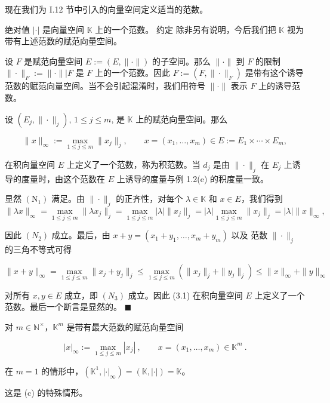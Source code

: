 现在我们为 I.12 节中引入的向量空间定义适当的范数。

\begin{example}

\begin{items}
\item

绝对值 $ |\cdot| $ 是向量空间 $ \mathbb{K} $ 上的一个范数。
约定 除非另有说明，今后我们把 $ \mathbb{K} $ 视为带有上述范数的赋范向量空间。

\item

设 $F$ 是赋范向量空间 $E := (E, \|\cdot\|)$ 的子空间。那么 $\|\cdot\|$ 到 $F$ 的限制 $\|\cdot\|_F := \|\cdot\| \big| F$ 是 $F$ 上的一个范数。因此 $F := (F, \|\cdot\|_F)$ 是带有这个诱导范数的赋范向量空间。当不会引起混淆时，我们用符号 $\|\cdot\|$ 表示 $F$ 上的诱导范数。

\item

设 $ (E_j, \|\cdot\|_j) $,  $ 1 \leq j \leq m $, 是 $ \mathbb{K} $ 上的赋范向量空间。那么

\begin{equation}
\|x\|_{\infty}:=\max_{1\leq j\leq m}\|x_{j}\|_{j},\qquad x=(x_{1},\ldots,x_{m})\in E:=E_{1}\times\cdots\times E_{m},
\end{equation}

在积向量空间 $E$ 上定义了一个范数，称为积范数。当 $d_j$ 是由 $\|\cdot\|_j$ 在 $E_j$ 上诱导的度量时，由这个范数在 $E$ 上诱导的度量与例 1.2(e) 的积度量一致。

\proofhead
显然 $ (\mathrm{N}_1) $ 满足。由 $ \|\cdot\|_j $ 的正齐性，对每个 $ \lambda \in \mathbb{K} $ 和 $ x \in E $，我们得到
\[
\|\lambda x\|_{\infty}=\max_{1\leq j\leq m}\|\lambda x_{j}\|_{j}=\max_{1\leq j\leq m}|\lambda|\|x_{j}\|_{j}=|\lambda|\max_{1\leq j\leq m}\|x_{j}\|_{j}=|\lambda|\|x\|_{\infty},
\]

因此 $ (N_{2}) $ 成立。最后，由 $ x + y = (x_{1} + y_{1}, \ldots, x_{m} + y_{m}) $ 以及
范数 $ \|\cdot\|_j $ 的三角不等式可得

\[
\|x+y\|_{\infty}=\max_{1\leq j\leq m}\|x_{j}+y_{j}\|_{j}\leq\max_{1\leq j\leq m}(\|x_{j}\|_{j}+\|y_{j}\|_{j})\leq\|x\|_{\infty}+\|y\|_{\infty}
\]

对所有 $ x, y \in E $ 成立，即 $ (N_3) $ 成立。因此 (3.1) 在积向量空间 $ E $ 上定义了一个范数。最后一个断言是显然的。 $ \blacksquare $

\item

对 $ m \in \mathbb{N}^\times $，$ \mathbb{K}^m $ 是带有最大范数的赋范向量空间

\[
|x|_{\infty}:=\operatorname*{m a x}_{1\leq j\leq m}|x_{j}|~,\qquad x=(x_{1},\ldots,x_{m})\in\mathbb{K}^{m}~.
\]

在 $ m = 1 $ 的情形中，$ (\mathbb{K}^1, |\cdot|_{\infty}) = (\mathbb{K}, |\cdot|) = \mathbb{K} $。

\proofhead
这是 (c) 的特殊情形。
\end{items}

\end{example}


